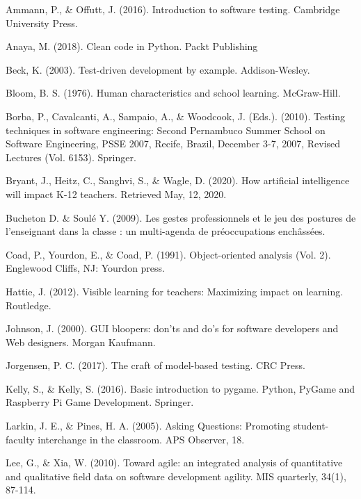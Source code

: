 \documentclass[10pt]{article}
\begin{document}
\begin{thebibliography}{Xyzz12}

 Ammann, P., \& Offutt, J. (2016). Introduction to software testing. Cambridge University Press.

 Anaya, M. (2018). Clean code in Python. Packt Publishing

 Beck, K. (2003). Test-driven development by example. Addison-Wesley.

 Bloom, B. S. (1976). Human characteristics and school learning. McGraw-Hill.

 Borba, P., Cavalcanti, A., Sampaio, A., \& Woodcook, J. (Eds.). (2010). Testing techniques in software engineering: Second Pernambuco Summer School on Software Engineering, PSSE 2007, Recife, Brazil, December 3-7, 2007, Revised Lectures (Vol. 6153). Springer.

 Bryant, J., Heitz, C., Sanghvi, S., \& Wagle, D. (2020). How artificial intelligence will impact K-12 teachers. Retrieved May, 12, 2020.

 Bucheton D. \& Soulé Y. (2009). Les gestes professionnels et le jeu des postures de l’enseignant dans la classe : un multi-agenda de préoccupations enchâssées.

 Coad, P., Yourdon, E., \& Coad, P. (1991). Object-oriented analysis (Vol. 2). Englewood Cliffs, NJ: Yourdon press.

 Hattie, J. (2012). Visible learning for teachers: Maximizing impact on learning. Routledge.

 Johnson, J. (2000). GUI bloopers: don'ts and do's for software developers and Web designers. Morgan Kaufmann.

 Jorgensen, P. C. (2017). The craft of model-based testing. CRC Press.

 Kelly, S., \& Kelly, S. (2016). Basic introduction to pygame. Python, PyGame and Raspberry Pi Game Development. Springer.

 Larkin, J. E., \& Pines, H. A. (2005). Asking Questions: Promoting student-faculty interchange in the classroom. APS Observer, 18.

 Lee, G., \& Xia, W. (2010). Toward agile: an integrated analysis of quantitative and qualitative field data on software development agility. MIS quarterly, 34(1), 87-114.


\end{thebibliography}
\end{document}
